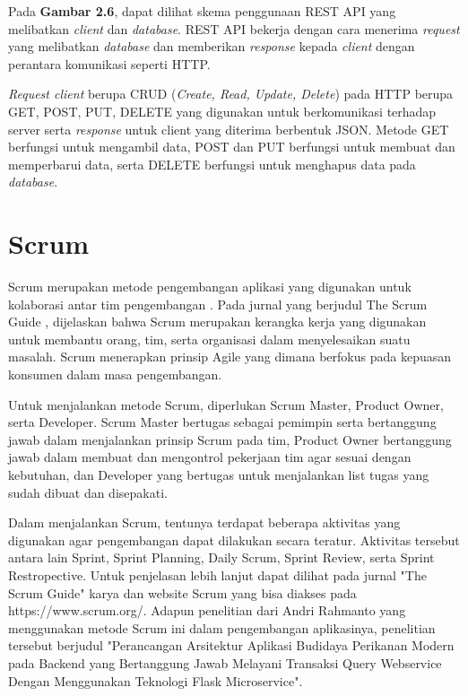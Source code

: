 Pada \textbf{Gambar 2.6}, dapat dilihat skema penggunaan REST API yang melibatkan \textit{client} dan \textit{database}. REST API bekerja dengan cara menerima \textit{request} yang melibatkan \textit{database} dan memberikan \textit{response} kepada \textit{client} dengan perantara komunikasi seperti HTTP.

\textit{Request client} berupa CRUD (\textit{Create, Read, Update, Delete}) pada HTTP berupa GET, POST, PUT, DELETE yang digunakan untuk berkomunikasi terhadap server serta \textit{response} untuk client yang diterima berbentuk JSON. Metode GET berfungsi untuk mengambil data, POST dan PUT berfungsi untuk membuat dan memperbarui data, serta DELETE berfungsi untuk menghapus data pada \textit{database}.

\section{Scrum}

Scrum merupakan metode pengembangan aplikasi yang digunakan untuk kolaborasi antar tim pengembangan \citep{scrumweb}. Pada jurnal yang berjudul The Scrum Guide \citep{scrum}, dijelaskan bahwa Scrum merupakan kerangka kerja yang digunakan untuk membantu orang, tim, serta organisasi dalam menyelesaikan suatu masalah. Scrum menerapkan prinsip Agile yang dimana berfokus pada kepuasan konsumen dalam masa pengembangan.

Untuk menjalankan metode Scrum, diperlukan Scrum Master, Product Owner, serta Developer. Scrum Master bertugas sebagai pemimpin serta bertanggung jawab dalam menjalankan prinsip Scrum pada tim, Product Owner bertanggung jawab dalam membuat dan mengontrol pekerjaan tim agar sesuai dengan kebutuhan, dan Developer yang bertugas untuk menjalankan list tugas yang sudah dibuat dan disepakati.

Dalam menjalankan Scrum, tentunya terdapat beberapa aktivitas yang digunakan agar pengembangan dapat dilakukan secara teratur. Aktivitas tersebut antara lain Sprint, Sprint Planning, Daily Scrum, Sprint Review, serta Sprint Restropective. Untuk penjelasan lebih lanjut dapat dilihat pada jurnal "The Scrum Guide" karya \citep{scrum} dan website Scrum yang bisa diakses pada https://www.scrum.org/. Adapun penelitian dari Andri Rahmanto yang menggunakan metode Scrum ini dalam pengembangan aplikasinya, penelitian tersebut berjudul "Perancangan Arsitektur Aplikasi Budidaya Perikanan Modern pada Backend yang Bertanggung Jawab Melayani Transaksi Query Webservice Dengan Menggunakan Teknologi Flask Microservice".

